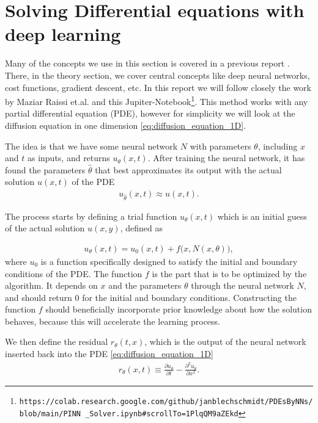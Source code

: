 \documentclass[12pt]{extarticle}
\begin{document}
\section{Solving Differential equations with deep learning}
Many of the concepts we use in this section is covered in a previous report \cite{project2}. There, in the theory section, we cover central concepts like deep neural networks, cost functions, gradient descent, etc. In this report we will follow closely the work by Maziar Raissi et.al. \cite{raissi2017physics} and this Jupiter-Notebook\footnote{\texttt{https://colab.research.google.com/github/janblechschmidt/PDEsByNNs/blob/main/PINN \_Solver.ipynb\#scrollTo=1PlqQM9aZEkd}}. This method works with any partial differential equation (PDE), however for simplicity we will look at the diffusion equation in one dimension \eqref{eq:diffusion_equation_1D}. 

The idea is that we have some neural network $N$ with parameters $\theta$, including $x$ and $t$ as inputs, and returns $u_{\theta}(x,t)$. After training the neural network, it has found the parameters $\hat{\theta}$ that best approximates its output with the actual solution $u(x,t)$ of the PDE
\begin{align*}
	u_{\hat{\theta}} (x, t) \approx u(x, t).
\end{align*}

The process starts by defining a trial function $u_{\theta}(x,t)$ which is an initial guess of the actual solution $u(x,y)$, defined as

\begin{align*}
	u_{\theta}(x,t) = u_0(x, t) + f\big(x, N(x,\theta)\big),
\end{align*}
where $u_0$ is a function specifically designed to satisfy the initial and boundary conditions of the PDE. The function $f$ is the part that is to be optimized by the algorithm. It depends on $x$ and the parameters $\theta$ through the neural network $N$, and should return 0 for the initial and boundary conditions. Constructing the function $f$ should beneficially incorporate prior knowledge about how the solution behaves, because this will accelerate the learning process.

\par We then define the residual $r_\theta(t, x)$, which is the output of the neural network inserted back into the PDE \eqref{eq:diffusion_equation_1D}
\begin{align}
	r_\theta(x, t) \equiv \frac{\partial u_\theta}{\partial t} - \frac{\partial^2 u_\theta}{\partial x^2}.
	\label{eq:residual}
\end{align}
\end{document}
